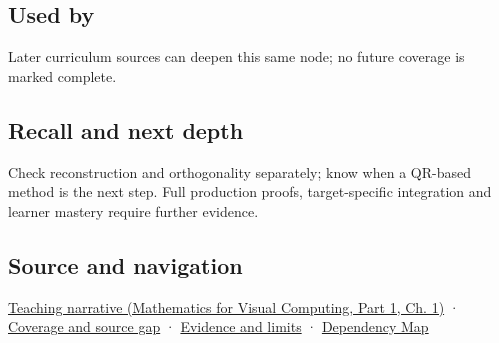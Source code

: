 \subsection{Used by}\label{appendix-c39f1ed34271-used-by}

\hypertarget{appendix-c39f1ed34271-used-by}{}

Later curriculum sources can deepen this same node; no future coverage is marked complete.

\subsection{Recall and next depth}\label{appendix-c39f1ed34271-recall-and-next-depth}

\hypertarget{appendix-c39f1ed34271-recall-and-next-depth}{}

Check reconstruction and orthogonality separately; know when a QR-based method is the next step. Full production proofs, target-specific integration and learner mastery require further evidence.

\subsection{Source and navigation}\label{appendix-c39f1ed34271-source-and-navigation}

\hypertarget{appendix-c39f1ed34271-source-and-navigation}{}

\href{../02-Mathematics-for-Visual-Computing-P01/main.pdf\#01-foundations-i-ch017-orthonormal-frames-make-reconstruction-simple}{Teaching narrative (Mathematics for Visual Computing, Part 1, Ch. 1)} · \hyperref[appendix-fd090d982a15-phase-6---parts-501-600]{Coverage and source gap} · \hyperref[appendix-a103e7846d21-phase-6---source-analysis-and-verification]{Evidence and limits} · \hyperref[appendix-4ad47bdd269a]{Dependency Map}

